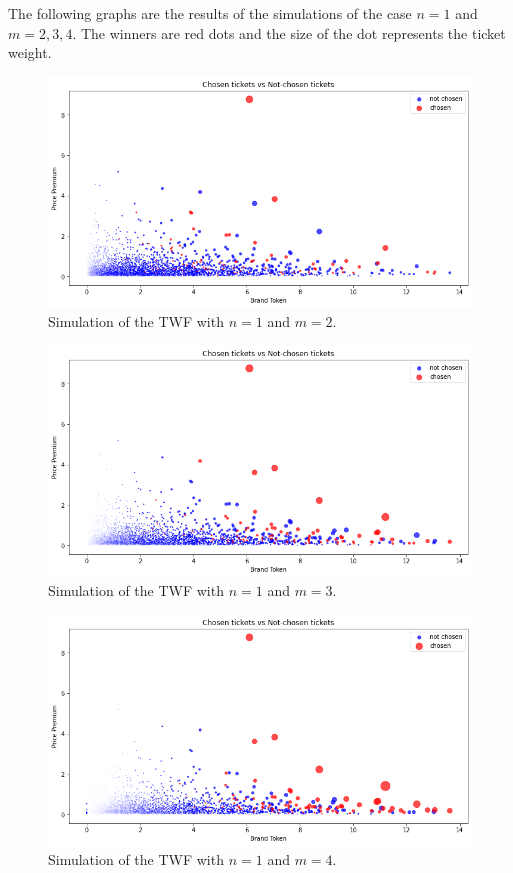 \documentclass[runningheads]{llncs}
\begin{document}
The following graphs are the results of the simulations of the case $n=1$ and $m=2,3,4$. The winners are red dots and the size of the dot represents the ticket weight.
\begin{figure}[H]
\centering
\includegraphics[scale=0.48]{Figures_and_Tables/simulation_n1m2.png}
\caption{Simulation of the TWF with $n=1$ and $m=2$. }
\label{fig:Lorenz}
\end{figure}
\begin{figure}[H]
\centering
\includegraphics[scale=0.48]{Figures_and_Tables/simulation_n1m3.png}
\caption{Simulation of the TWF with $n=1$ and $m=3$. }
\label{fig:Lorenz}
\end{figure}
\begin{figure}[H]
\centering
\includegraphics[scale=0.48]{Figures_and_Tables/simulation_n1m4.png}
\caption{Simulation of the TWF with $n=1$ and $m=4$. }
\label{fig:Lorenz}
\end{figure}
\end{document}
